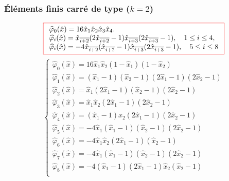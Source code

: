 \documentclass{beamer}
\newcommand{\myredbox}[1]{\fcolorbox{red}{white}{$\displaystyle#1$}}
\begin{document}
\begin{frame}
\frametitle{Éléments finis carré de type ($k=2$)}
 \begin{center}
   \end{center}  
\[\myredbox{\begin{array}{l}
 \widehat{\varphi}_0(\hat{x})=16 \hat{x}_1\hat{x}_2\hat{x}_3\hat{x}_4.\\
  \widehat{\varphi}_i(\hat{x})=\hat{x}_{\overline{i+2}}(2\hat{x}_{\overline{i+2}}-1)\hat{x}_{\overline{i+3}}(2\hat{x}_{\overline{i+3}}-1),\quad 1\leq i\leq 4,\\
  \widehat{\varphi}_i(\hat{x})=-4\hat{x}_{\overline{i+2}}(\hat{x}_{\overline{i+2}}-1)\hat{x}_{\overline{i+3}}(2\hat{x}_{\overline{i+3}}-1),\quad 5\leq i\leq 8
\end{array}  }            
\]
\[\left\{\begin{array}{l}
 \widehat{\varphi}_0(\hat{x})=16 \hat{x}_1\hat{x}_2(1-\hat{x}_1)(1-\hat{x}_2)\\
  \widehat{\varphi}_1(\hat{x})=(\hat{x}_1-1)(\hat{x}_2-1)(2\hat{x}_1-1)(2\hat{x}_2-1)\\
  \widehat{\varphi}_2(\hat{x})=\hat{x}_1(2\hat{x}_1-1)(\hat{x}_2-1)(2\hat{x}_2-1)\\
  \widehat{\varphi}_3(\hat{x})=\hat{x}_1\hat{x}_2(2\hat{x}_1-1)(2\hat{x}_2-1)\\
  \widehat{\varphi}_4(\hat{x})=(\hat{x}_1-1)\hat{x}_2(2\hat{x}_1-1)(2\hat{x}_2-1)\\
  \widehat{\varphi}_5(\hat{x})=-4\hat{x}_1(\hat{x}_1-1)(\hat{x}_2-1)(2\hat{x}_2-1)\\
    \widehat{\varphi}_6(\hat{x})=-4\hat{x}_1\hat{x}_2(2\hat{x}_1-1)(\hat{x}_2-1)\\
      \widehat{\varphi}_7(\hat{x})=-4\hat{x}_1(\hat{x}_1-1)(\hat{x}_2-1)(2\hat{x}_2-1)\\
    \widehat{\varphi}_8(\hat{x})=-4(\hat{x}_1-1)(2\hat{x}_1-1)\hat{x}_2(\hat{x}_2-1)\\
\end{array}\right.            
\]

\end{frame}
\end{document}
